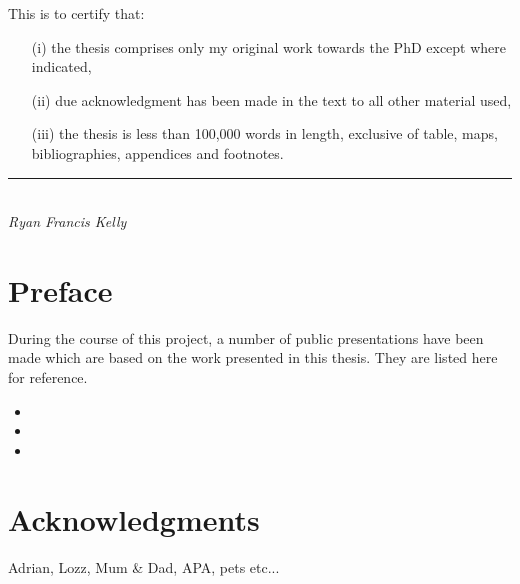 This is to certify that:
\begin{itemize}
\item[(i)] the thesis comprises only my original work towards the PhD except where indicated,
\item[(ii)] due acknowledgment has been made in the text to all other material used,
\item[(iii)] the thesis is less than 100,000 words in length, exclusive of table, maps, bibliographies, appendices and footnotes.
\end{itemize}
\vspace{3cm}
\rule{70mm}{0.1mm}\\
\emph{Ryan Francis Kelly}

\chapter*{Preface} %
During the course of this project, a number of public presentations have been made which are based on the work
presented in this thesis. They are listed here for reference.
\nobibliography*
\begin{itemize}
\item {}
\item {}
\item {}
\end{itemize}


\chapter*{Acknowledgments} %

Adrian, Lozz, Mum \& Dad, APA, pets etc...

\singlespace    %
\tableofcontents
\listoftables
\listoffigures

\newpage
{}








\appendix


\singlespace




